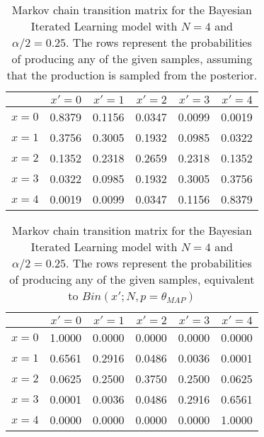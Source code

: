 \begin{table}[htbp]
\centering
\begin{tabular}{rrrrrr}
  \hline
 & $x'=0$ & $x'=1$ & $x'=2$ & $x'=3$ & $x'=4$ \\ 
  \hline
$x=0$ & 0.8379 & 0.1156 & 0.0347 & 0.0099 & 0.0019 \\ 
  $x=1$ & 0.3756 & 0.3005 & 0.1932 & 0.0985 & 0.0322 \\ 
  $x=2$ & 0.1352 & 0.2318 & 0.2659 & 0.2318 & 0.1352 \\ 
  $x=3$ & 0.0322 & 0.0985 & 0.1932 & 0.3005 & 0.3756 \\ 
  $x=4$ & 0.0019 & 0.0099 & 0.0347 & 0.1156 & 0.8379 \\ 
   \hline
\end{tabular}
\caption[Markov chain transition matrix for the Bayesian Iterated Learning model with sampling from the posterior]{Markov chain transition matrix for the Bayesian Iterated Learning model with $N=4$ and $\alpha/2=0.25$. The rows represent the probabilities of producing any of the given samples, assuming that the production is sampled from the posterior.} 
\label{tbl:transitionmatrixsample}
\end{table}
\begin{table}[htbp]
\centering
\begin{tabular}{rrrrrr}
  \hline
 & $x'=0$ & $x'=1$ & $x'=2$ & $x'=3$ & $x'=4$ \\ 
  \hline
$x=0$ & 1.0000 & 0.0000 & 0.0000 & 0.0000 & 0.0000 \\ 
  $x=1$ & 0.6561 & 0.2916 & 0.0486 & 0.0036 & 0.0001 \\ 
  $x=2$ & 0.0625 & 0.2500 & 0.3750 & 0.2500 & 0.0625 \\ 
  $x=3$ & 0.0001 & 0.0036 & 0.0486 & 0.2916 & 0.6561 \\ 
  $x=4$ & 0.0000 & 0.0000 & 0.0000 & 0.0000 & 1.0000 \\ 
   \hline
\end{tabular}
\caption[Markov chain transition matrix for the Bayesian Iterated Learning model selecting the mean of the posterior]{Markov chain transition matrix for the Bayesian Iterated Learning model with $N=4$ and $\alpha/2=0.25$. The rows represent the probabilities of producing any of the given samples, equivalent to $Bin(x';N,p=\theta_{MAP})$} 
\label{tbl:transitionmatrixmap}
\end{table}



